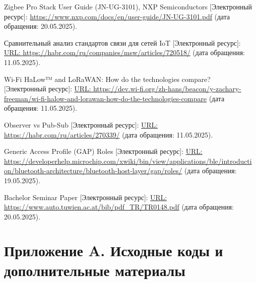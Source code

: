 \documentclass[a4paper,12pt]{article}
\begin{document}
\begin{thebibliography}{40}


 Zigbee Pro Stack User Guide (JN-UG-3101), NXP Semiconductors [Электронный ресурс]: \url{https://www.nxp.com/docs/en/user-guide/JN-UG-3101.pdf} (дата обращения: 20.05.2025).

 Сравнительный анализ стандартов связи для сетей IoT [Электронный ресурс]: \url{URL: https://habr.com/ru/companies/msw/articles/720518/} (дата обращения: 11.05.2025).

 Wi-Fi HaLow™ and LoRaWAN: How do the technologies compare? [Электронный ресурс]: \url{URL: https://dev.wi-fi.org/zh-hans/beacon/y-zachary-freeman/wi-fi-halow-and-lorawan-how-do-the-technologies-compare} (дата обращения: 11.05.2025).

 Observer vs Pub-Sub [Электронный ресурс]: \url{URL: https://habr.com/ru/articles/270339/} (дата обращения: 11.05.2025).

 Generic Access Profile (GAP) Roles [Электронный ресурс]: \url{URL: https://developerhelp.microchip.com/xwiki/bin/view/applications/ble/introduction/bluetooth-architecture/bluetooth-host-layer/gap/roles/} (дата обращения: 19.05.2025).

 Bachelor Seminar Paper  [Электронный ресурс]: \url{URL: https://www.auto.tuwien.ac.at/bib/pdf_TR/TR0148.pdf} (дата обращения: 20.05.2025).

\end{thebibliography}

\newpage
\appendix
\renewcommand{\thesection}{\Alph{section}} %

\section*{Приложение A. Исходные коды и дополнительные материалы}
\end{document}

